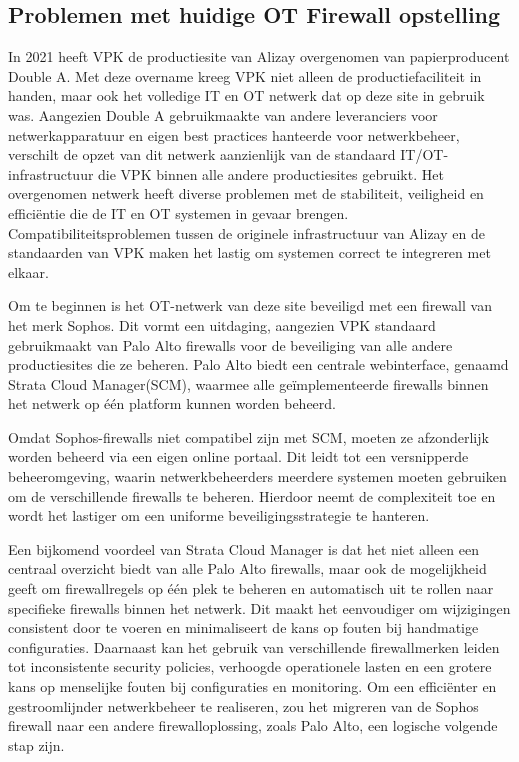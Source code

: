 \subsection{Problemen met huidige OT Firewall opstelling}
In 2021 heeft VPK de productiesite van Alizay overgenomen van papierproducent Double A. Met deze overname kreeg VPK niet alleen de productiefaciliteit in handen, maar ook het volledige IT en OT netwerk dat op deze site in gebruik was. Aangezien Double A gebruikmaakte van andere leveranciers voor netwerkapparatuur en eigen best practices hanteerde voor netwerkbeheer, verschilt de opzet van dit netwerk aanzienlijk van de standaard IT/OT-infrastructuur die VPK binnen alle andere productiesites gebruikt.
Het overgenomen netwerk heeft diverse problemen met de stabiliteit, veiligheid en efficiëntie die de IT en OT systemen in gevaar brengen. Compatibiliteitsproblemen tussen de originele infrastructuur van Alizay en de standaarden van VPK maken het lastig om systemen correct te integreren met elkaar.
 
Om te beginnen is het OT-netwerk van deze site beveiligd met een firewall van het merk Sophos. Dit vormt een uitdaging, aangezien VPK standaard gebruikmaakt van Palo Alto firewalls voor de beveiliging van alle andere productiesites die ze beheren. Palo Alto biedt een centrale webinterface, genaamd Strata Cloud Manager(SCM), waarmee alle geïmplementeerde firewalls binnen het netwerk op één platform kunnen worden beheerd.

Omdat Sophos-firewalls niet compatibel zijn met SCM, moeten ze afzonderlijk worden beheerd via een eigen online portaal. Dit leidt tot een versnipperde beheeromgeving, waarin netwerkbeheerders meerdere systemen moeten gebruiken om de verschillende firewalls te beheren. Hierdoor neemt de complexiteit toe en wordt het lastiger om een uniforme beveiligingsstrategie te hanteren.

Een bijkomend voordeel van Strata Cloud Manager is dat het niet alleen een centraal overzicht biedt van alle Palo Alto firewalls, maar ook de mogelijkheid geeft om firewallregels op één plek te beheren en automatisch uit te rollen naar specifieke firewalls binnen het netwerk. Dit maakt het eenvoudiger om wijzigingen consistent door te voeren en minimaliseert de kans op fouten bij handmatige configuraties.
Daarnaast kan het gebruik van verschillende firewallmerken leiden tot inconsistente security policies, verhoogde operationele lasten en een grotere kans op menselijke fouten bij configuraties en monitoring. Om een efficiënter en gestroomlijnder netwerkbeheer te realiseren, zou het migreren van de Sophos firewall naar een andere firewalloplossing, zoals Palo Alto, een logische volgende stap zijn.

